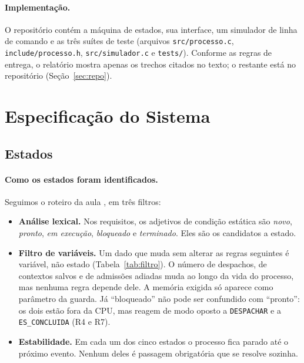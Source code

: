 \documentclass[11pt,a4paper]{article}
\theoremstyle{definition}
\newcommand{\ev}[1]{\texttt{\small #1}}    %
\begin{document}
\paragraph{Implementação.} O repositório contém a máquina de estados, sua interface, um simulador
de linha de comando e as três suítes de teste (arquivos \texttt{src/processo.c},
\texttt{include/processo.h}, \texttt{src/simulador.c} e \texttt{tests/}). Conforme
as regras de entrega, o relatório mostra apenas os trechos citados no texto; o restante está no
repositório (Seção~\ref{sec:repo}).

\section{Especificação do Sistema}

\subsection{Estados}\label{sec:estados}

\paragraph{Como os estados foram identificados.} Seguimos o roteiro da aula \cite{aula}, em três filtros:
\begin{itemize}
  \item \textbf{Análise lexical.} Nos requisitos, os adjetivos de condição estática são
        \emph{novo}, \emph{pronto}, \emph{em execução}, \emph{bloqueado} e \emph{terminado}.
        Eles são os candidatos a estado.
  \item \textbf{Filtro de variáveis.} Um dado que muda sem alterar as regras seguintes é variável,
        não estado (Tabela~\ref{tab:filtro}). O número de despachos, de contextos salvos e de
        admissões adiadas muda ao longo da vida do processo, mas nenhuma regra depende dele. A
        memória exigida só aparece como parâmetro da guarda. Já ``bloqueado'' não pode ser
        confundido com ``pronto'': os dois estão fora da CPU, mas reagem de modo oposto a
        \ev{DESPACHAR} e a \ev{ES\_CONCLUIDA} (R4 e R7).
  \item \textbf{Estabilidade.} Em cada um dos cinco estados o processo fica parado até o próximo
        evento. Nenhum deles é passagem obrigatória que se resolve sozinha.
\end{itemize}
\end{document}
